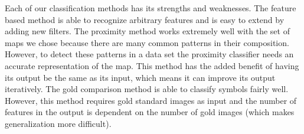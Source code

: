 
Each of our classification methods has its strengths and weaknesses.  The
feature based method is able to recognize arbitrary features and is easy
to extend by adding new filters.  The proximity method works extremely well
with the set of maps we chose because there are many common patterns in their
composition.  However, to detect these patterns in a data set the proximity
classifier needs an accurate representation of the map. This method has the
added benefit of having its output be the same as its input, which means it can
improve its output iteratively.  The gold comparison method is able to classify
symbols fairly well. However, this method requires gold standard images as input and the
number of features in the output is dependent on the number of gold images
(which makes generalization more difficult).

